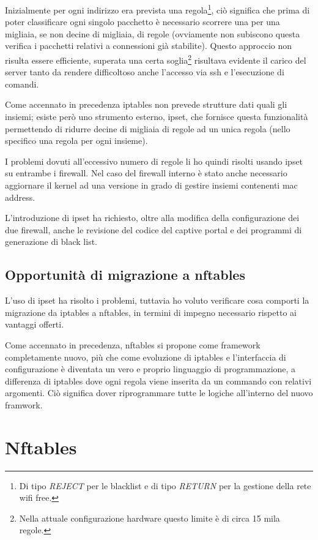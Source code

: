 Inizialmente per ogni indirizzo era prevista una regola\footnote{Di tipo {\em
REJECT} per le blacklist e di tipo {\em RETURN} per la gestione della rete wifi
free.}, ciò significa che prima di poter classificare ogni singolo pacchetto
\`e necessario scorrere una per una migliaia, se non decine di migliaia, di
regole (ovviamente non subiscono questa verifica i pacchetti relativi a
connessioni gi\`a stabilite).  Questo approccio non risulta essere efficiente,
superata una certa soglia\footnote{Nella attuale configurazione hardware
questo limite \`e di circa 15 mila regole.}
risultava evidente il carico del server tanto da rendere difficoltoso anche
l'accesso via ssh e l'esecuzione di comandi.

Come accennato in precedenza iptables non prevede strutture dati quali gli
insiemi; esiste per\`o uno strumento esterno, ipset, che fornisce questa
funzionalità permettendo di ridurre decine di migliaia di regole ad un unica
regola (nello specifico una regola per ogni insieme).

I problemi dovuti all'eccessivo numero di regole li ho quindi risolti usando
ipset su entrambe i firewall.  Nel caso del firewall interno è stato anche
necessario aggiornare il kernel ad una versione in grado di gestire insiemi
contenenti mac address.

L'introduzione di ipset ha richiesto, oltre alla modifica della configurazione
dei due firewall, anche le revisione del codice del captive portal e dei
programmi di generazione di black list.

\section{Opportunità di migrazione a nftables}

L'uso di ipset ha risolto i problemi, tuttavia ho voluto verificare cosa
comporti la migrazione da iptables a nftables, in termini di impegno necessario
rispetto ai vantaggi offerti.

Come accennato in precedenza, nftables si propone come framework completamente
nuovo, più che come evoluzione di iptables  e l'interfaccia di configurazione
è diventata un vero e proprio linguaggio di programmazione, a differenza di
iptables dove ogni regola viene inserita da un commando con relativi
argomenti.  Ci\`o significa dover riprogrammare tutte le logiche all'interno
del nuovo framwork.

\chapter{Nftables}

